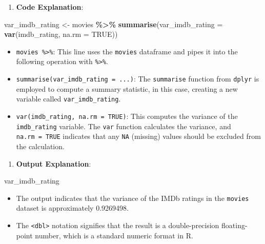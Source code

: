 \documentclass[
]{book}
\newenvironment{Shaded}{\begin{snugshade}}{\end{snugshade}}
\newcommand{\AttributeTok}[1]{\textcolor[rgb]{0.13,0.29,0.53}{#1}}
\newcommand{\ConstantTok}[1]{\textcolor[rgb]{0.56,0.35,0.01}{#1}}
\newcommand{\FunctionTok}[1]{\textcolor[rgb]{0.13,0.29,0.53}{\textbf{#1}}}
\newcommand{\NormalTok}[1]{#1}
\newcommand{\OtherTok}[1]{\textcolor[rgb]{0.56,0.35,0.01}{#1}}
\newcommand{\SpecialCharTok}[1]{\textcolor[rgb]{0.81,0.36,0.00}{\textbf{#1}}}
\providecommand{\tightlist}{%
  \setlength{\itemsep}{0pt}\setlength{\parskip}{0pt}}
\begin{document}
\begin{enumerate}
\def\labelenumi{\arabic{enumi}.}
\tightlist
\item
  \textbf{Code Explanation}:
\end{enumerate}

\begin{Shaded}
\begin{Highlighting}[]
\NormalTok{var\_imdb\_rating }\OtherTok{\textless{}{-}}\NormalTok{ movies }\SpecialCharTok{\%\textgreater{}\%}
  \FunctionTok{summarise}\NormalTok{(}\AttributeTok{var\_imdb\_rating =} \FunctionTok{var}\NormalTok{(imdb\_rating, }\AttributeTok{na.rm =} \ConstantTok{TRUE}\NormalTok{))}
\end{Highlighting}
\end{Shaded}

\begin{itemize}
\tightlist
\item
  \texttt{movies\ \%\textgreater{}\%}: This line uses the \texttt{movies} dataframe and pipes it into the following operation with \texttt{\%\textgreater{}\%}.
\item
  \texttt{summarise(var\_imdb\_rating\ =\ ...)}: The \texttt{summarise} function from \texttt{dplyr} is employed to compute a summary statistic, in this case, creating a new variable called \texttt{var\_imdb\_rating}.
\item
  \texttt{var(imdb\_rating,\ na.rm\ =\ TRUE)}: This computes the variance of the \texttt{imdb\_rating} variable. The \texttt{var} function calculates the variance, and \texttt{na.rm\ =\ TRUE} indicates that any \texttt{NA} (missing) values should be excluded from the calculation.
\end{itemize}

\begin{enumerate}
\def\labelenumi{\arabic{enumi}.}
\setcounter{enumi}{1}
\tightlist
\item
  \textbf{Output Explanation}:
\end{enumerate}

\begin{Shaded}
\begin{Highlighting}[]
\NormalTok{var\_imdb\_rating}
\end{Highlighting}
\end{Shaded}

\begin{itemize}
\tightlist
\item
  The output indicates that the variance of the IMDb ratings in the \texttt{movies} dataset is approximately 0.9269498.
\item
  The \texttt{\textless{}dbl\textgreater{}} notation signifies that the result is a double-precision floating-point number, which is a standard numeric format in R.
\end{itemize}
\end{document}

